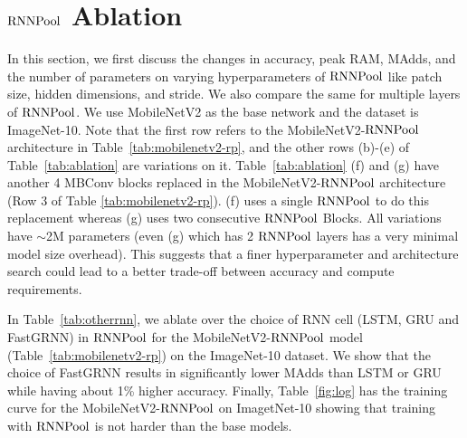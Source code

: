 \documentclass[10pt]{article}
\newcommand{\rpool}{\ensuremath{{\rm RNNPool}}\xspace}
\begin{document}
 \section{\rpool Ablation}
\label{sec:ablation}
In this section, we first discuss the changes in accuracy, peak RAM, MAdds, and the number of parameters on varying hyperparameters of \rpool like patch size, hidden dimensions, and stride. We also compare the same for multiple layers of \rpool. We use MobileNetV2 as the base network and the dataset is ImageNet-10. Note that the first row refers to the MobileNetV2-\rpool architecture in Table~\ref{tab:mobilenetv2-rp}, and the other rows (b)-(e) of Table~\ref{tab:ablation} are variations on it. Table~\ref{tab:ablation} (f) and (g) have another 4 MBConv blocks replaced in the MobileNetV2-\rpool architecture (Row 3 of Table \ref{tab:mobilenetv2-rp}). (f) uses a single \rpool to do this replacement whereas (g) uses two consecutive \rpool Blocks. All variations have $\sim$2M parameters (even (g) which has 2 \rpool layers has a very minimal model size overhead). This suggests that a finer hyperparameter and architecture search could lead to a better trade-off between accuracy and compute requirements.
\begin{table}[h]
\centering
    \caption{\small Comparison of accuracy, peak RAM and MAdds for variations in hidden dimensions, patch size and stride in RNNPool for MobileNetV2 and on ImageNet-10 dataset. Parameters are same as the base if not mentioned. (f) and (g) are further replacements in MobileNetV2-\rpool (Row 3 of Table~\ref{tab:mobilenetv2-rp}).}
\label{tab:ablation}
\end{table} 
In Table~\ref{tab:otherrnn}, we ablate over the choice of RNN cell (LSTM, GRU and FastGRNN) in \rpool for the MobileNetV2-\rpool model (Table~\ref{tab:mobilenetv2-rp}) on the ImageNet-10 dataset. We show that the choice of FastGRNN results in significantly lower MAdds than LSTM or GRU while having about 1\% higher accuracy. Finally, Table~\ref{fig:log} has the training curve for the MobileNetV2-\rpool on ImagetNet-10 showing that training with \rpool is not harder than the base models.
\end{document}
